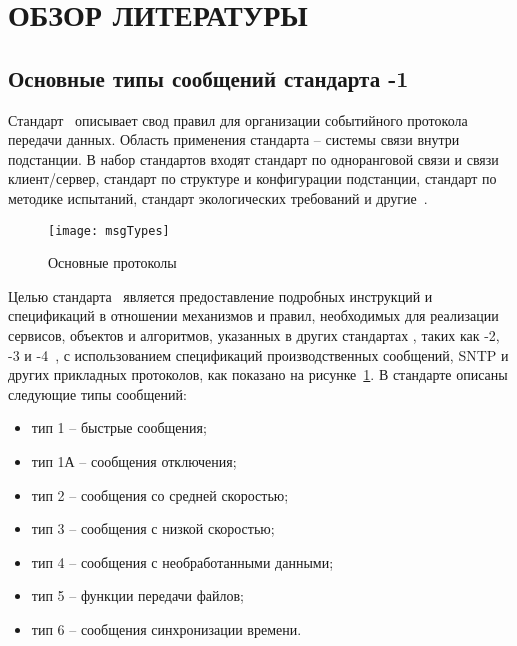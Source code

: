 \section{ОБЗОР ЛИТЕРАТУРЫ}
\label{sec:domain}

\subsection{Основные типы сообщений стандарта -1}

Стандарт \iecStd\ описывает свод правил для организации событийного протокола
передачи данных. Область применения стандарта -- системы связи внутри подстанции.
В набор стандартов входят стандарт по одноранговой связи и связи клиент/сервер,
стандарт по структуре и конфигурации подстанции, стандарт по методике испытаний,
стандарт экологических требований и другие~\cite{iec_description}.

\begin{figure}[ht]
    \centering
    \texttt{[image: msgTypes]}
    \caption{Основные протоколы \iecStd}
    \label{pic::domain::msg_types}
\end{figure}

Целью стандарта \ является предоставление подробных
инструкций и
спецификаций в отношении механизмов и правил, необходимых для реализации сервисов,
объектов и алгоритмов, указанных в других стандартах \iec, таких как
-2, -3 и -4~\cite{IEC61850_7_2, IEC61850_7_3,
IEC61850_7_4}, с использованием спецификаций производственных сообщений,
SNTP и других прикладных протоколов, как показано
на рисунке~\ref{pic::domain::msg_types}.
В стандарте описаны следующие типы сообщений:

\begin{itemize}
    \item тип 1 -- быстрые сообщения;
    \item тип 1А -- сообщения отключения;
    \item тип 2 -- сообщения со средней скоростью;
    \item тип 3 -- сообщения с низкой скоростью;
    \item тип 4 -- сообщения с необработанными данными;
    \item тип 5 -- функции передачи файлов;
    \item тип 6 -- сообщения синхронизации времени.
\end{itemize}


